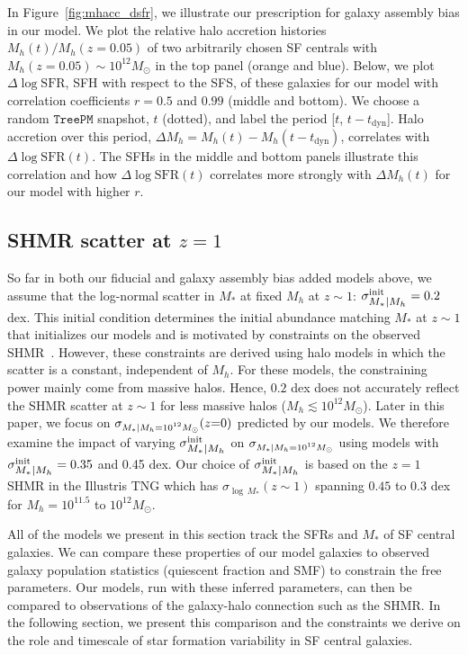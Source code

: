 \documentclass[12pt, letterpaper, preprint, tighten]{aastex62}
\newcommand{\logsfr}{\log\mathrm{SFR}}
\newcommand{\siglogm}{\sigma_{\scaleto{M_*|M_h}{8pt}}}
\newcommand{\sigtwe}{\sigma_{\scaleto{M_*|M_h=10^{12}M_\odot}{8pt}}}
\begin{document}
In Figure~\ref{fig:mhacc_dsfr}, we illustrate our prescription for galaxy
assembly bias in our model. We plot the relative halo accretion histories
$M_h(t)/M_h(z{=}0.05)$ of two arbitrarily chosen SF centrals with
$M_h(z{=}0.05)\sim10^{12}M_\odot$ in the top panel (orange and blue). Below, we plot
$\Delta\logsfr$, SFH with respect to the SFS, of these galaxies for our model with
correlation coefficients $r=0.5$ and $0.99$ (middle and bottom). We choose a
random $\mathtt{TreePM}$ snapshot, $t$ (dotted), and label the period
[$t$, $t - t_\mathrm{dyn}$]. Halo accretion over this period,
$\Delta M_h = M_h(t) - M_h(t-t_\mathrm{dyn})$, correlates with $\Delta\logsfr(t)$.
The SFHs in the middle and bottom panels illustrate this correlation and how
$\Delta\logsfr(t)$ correlates more strongly with $\Delta M_h(t)$ for our model
with higher $r$.

\subsection{SHMR scatter at $z=1$} \label{sec:siglogm_init}
So far in both our fiducial and galaxy assembly bias added models above, 
we assume that the log-normal scatter in $M_*$ at fixed $M_h$ at $z\sim1$:
$\siglogm^{\rm init} = 0.2$ dex. This initial condition determines
the initial abundance matching $M_*$ at $z\sim1$ that initializes our models and is motivated
by constraints on the observed SHMR~\citep[\emph{e.g.}][]{leauthaud2012, tinker2013, patel2015}. 
However, these constraints are derived using halo models in which the scatter 
is a constant, independent of $M_h$. For these models, the constraining power 
mainly come from massive halos. Hence, $0.2$ dex does not accurately reflect 
the SHMR scatter at $z\sim1$ for less massive halos 
($M_h \lesssim 10^{12}M_\odot$). Later in this paper, we focus on 
$\sigtwe(z{=}0)$ predicted by our models. We 
therefore examine the impact of varying $\siglogm^{\rm init}$ on 
$\sigtwe$ using models with $\siglogm^{\rm init} = 0.35$ and 0.45 dex. 
Our choice of $\siglogm^{\rm init}$ is
based on the $z=1$ SHMR in the Illustris TNG which has $\sigma_{\log\,M_*}(z\sim1)$
spanning $0.45$ to $0.3$ dex for $M_h = 10^{11.5}$ to $10^{12}M_\odot$.

All of the models we present in this section track the SFRs and $M_*$ of SF
central galaxies. We can compare these properties of our model galaxies
to observed galaxy population statistics (quiescent fraction and SMF) to
constrain the free parameters. Our models, run with these inferred parameters, 
can then be compared to observations of the galaxy-halo connection such as the 
SHMR. In the following section, we present this comparison and the constraints 
we derive on the role and timescale of star formation variability in SF central 
galaxies.
\end{document}
